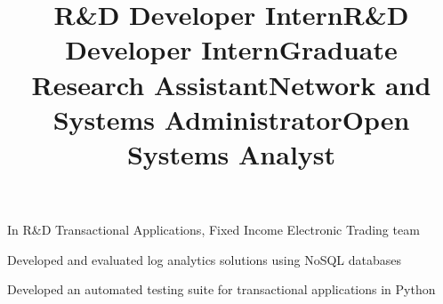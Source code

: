 \documentclass[margin,line]{resume}
\begin{document}
\begin{resume}
    \title{\textbf{R\&D Developer Intern}}
    \begin{position}
    \end{position}

    \title{\textbf{R\&D Developer Intern}}
    \begin{position}

    In R\&D Transactional Applications, Fixed Income Electronic Trading team
    \begin{list3}
    \item Developed and evaluated log analytics solutions using NoSQL databases
    \item Developed an automated testing suite for transactional applications in Python
    \end{list3}
    \end{position}
    
    \title{\textbf{Graduate Research Assistant}}
    \begin{position}\end{position}

    \title{\textbf{Network and Systems Administrator}}
    \begin{position}
    \vspace{-2mm}
    \end{position}

    \title{\textbf{Open Systems Analyst}}


\end{resume}
\end{document}
